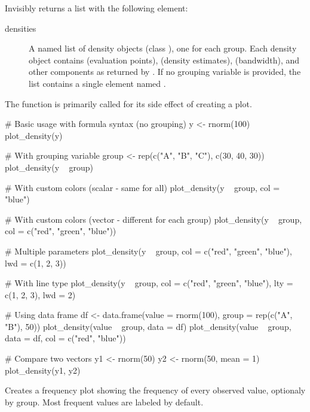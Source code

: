 \documentclass[a4paper]{book}
\begin{document}
\begin{Value}
Invisibly returns a list with the following element:
\begin{description}

\item[densities] A named list of density objects (class ), 
one for each group. Each density object contains  (evaluation points), 
 (density estimates),  (bandwidth), and other components 
as returned by . If no grouping variable is 
provided, the list contains a single element named .

\end{description}

The function is primarily called for its side effect of creating a plot.
\end{Value}
%
\begin{Examples}
\begin{ExampleCode}
# Basic usage with formula syntax (no grouping)
y <- rnorm(100)
plot_density(y)

# With grouping variable
group <- rep(c("A", "B", "C"), c(30, 40, 30))
plot_density(y ~ group)

# With custom colors (scalar - same for all)
plot_density(y ~ group, col = "blue")

# With custom colors (vector - different for each group)
plot_density(y ~ group, col = c("red", "green", "blue"))

# Multiple parameters
plot_density(y ~ group, col = c("red", "green", "blue"), lwd = c(1, 2, 3))

# With line type
plot_density(y ~ group, col = c("red", "green", "blue"), lty = c(1, 2, 3), lwd = 2)

# Using data frame
df <- data.frame(value = rnorm(100), group = rep(c("A", "B"), 50))
plot_density(value ~ group, data = df)
plot_density(value ~ group, data = df, col = c("red", "blue"))

# Compare two vectors
y1 <- rnorm(50)
y2 <- rnorm(50, mean = 1)
plot_density(y1, y2)

\end{ExampleCode}
\end{Examples}
%
\begin{Description}
Creates a frequency plot showing the frequency of every observed value, optionaly by group. 
Most frequent values are labeled by default.
\end{Description}
\end{document}
